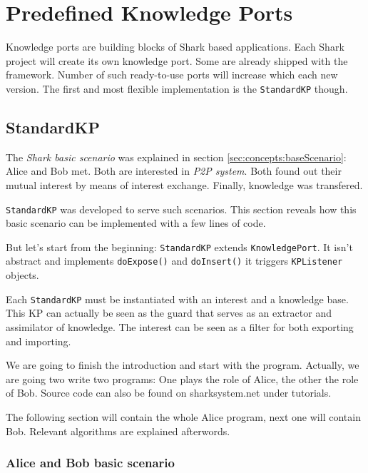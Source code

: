 \chapter{Predefined Knowledge Ports}
Knowledge ports are building blocks of Shark based applications.
Each Shark project will create its own knowledge port. Some are
already shipped with the framework. Number of such ready-to-use
ports will increase which each new version. The first and most flexible 
implementation is the {\tt StandardKP} though. 

\section{StandardKP}
\label{sec:knowledgePorts:StandardKP}
The  {\it Shark basic scenario} was explained in section \ref{sec:concepts:baseScenario}: Alice and Bob met. Both are interested in {\it P2P system}. Both found out their mutual interest by means of interest exchange. Finally, knowledge was transfered.

{\tt StandardKP} was developed to serve such scenarios. This section reveals how this basic scenario can be implemented with a few lines of code.

But let's start from the beginning: {\tt StandardKP} extends {\tt KnowledgePort}. It isn't abstract and implements {\tt doExpose()} and {\tt doInsert()} it triggers {\tt KPListener} objects.

Each {\tt StandardKP} must be instantiated with an interest and a knowledge base. This KP can actually be seen as the guard that serves as an extractor and
assimilator of knowledge. The interest can be seen as a filter for both exporting and importing. 

We are going to finish the introduction and start with the program. Actually, we are going two write two programs: One plays the role of Alice, the other the role of Bob. Source code can also be found on sharksystem.net under tutorials.

The following section will contain the whole Alice program, next one will contain Bob. Relevant algorithms are explained afterwords.

\subsection{Alice and Bob basic scenario}
